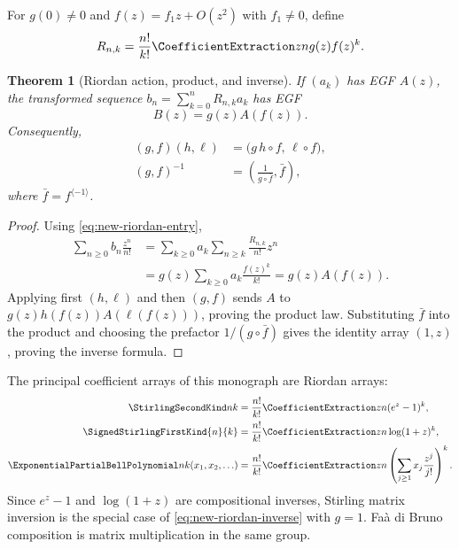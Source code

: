 \documentclass[11pt,a4paper,oneside,openany]{book}
\newtheorem{theorem}{Theorem}[chapter]
\theoremstyle{definition}
\theoremstyle{remark}
\begin{document}
For $g(0)\ne0$ and $f(z)=f_1z+O(z^2)$ with $f_1\ne0$, define
\begin{equation}\label{eq:new-riordan-entry}
 R_{n,k}=\frac{n!}{k!}\CoefficientExtraction z n g(z)f(z)^k.
\end{equation}

\begin{theorem}[Riordan action, product, and inverse]\label{thm:new-riordan}
If $(a_k)$ has EGF $A(z)$, the transformed sequence
$b_n=\sum_{k=0}^nR_{n,k}a_k$ has EGF
\begin{equation}\label{eq:new-riordan-action}
 B(z)=g(z)A(f(z)).
\end{equation}
Consequently,
\begin{align}
 (g,f)(h,\ell)&=\bigl(g\,h\!\circ f,\,\ell\!\circ f\bigr),
 \label{eq:new-riordan-product}\\
 (g,f)^{-1}&=\left(\frac1{g\circ\bar f},\bar f\right),
 \label{eq:new-riordan-inverse}
\end{align}
where $\bar f=f^{\langle-1\rangle}$.
\end{theorem}

\begin{proof}
Using \eqref{eq:new-riordan-entry},
\begin{align*}
 \sum_{n\ge0}b_n\frac{z^n}{n!}
 &=\sum_{k\ge0}a_k\sum_{n\ge k}\frac{R_{n,k}}{n!}z^n\\
 &=g(z)\sum_{k\ge0}a_k\frac{f(z)^k}{k!}=g(z)A(f(z)).
\end{align*}
Applying first $(h,\ell)$ and then $(g,f)$ sends $A$ to
$g(z)h(f(z))A(\ell(f(z)))$, proving the product law.  Substituting
$\bar f$ into the product and choosing the prefactor $1/(g\circ\bar f)$
gives the identity array $(1,z)$, proving the inverse formula.
\end{proof}

The principal coefficient arrays of this monograph are Riordan arrays:
\begin{align}
 \StirlingSecondKind nk&=\frac{n!}{k!}\CoefficientExtraction z n(e^z-1)^k,
 \label{eq:new-s2-riordan}\\
 \SignedStirlingFirstKind{n}{k}&=\frac{n!}{k!}\CoefficientExtraction z n\log(1+z)^k,
 \label{eq:new-s1-riordan}\\
 \ExponentialPartialBellPolynomial nk(x_1,x_2,\ldots)
 &=\frac{n!}{k!}\CoefficientExtraction z n
 \left(\sum_{j\ge1}x_j\frac{z^j}{j!}\right)^k.
 \label{eq:new-bell-riordan}
\end{align}
Since $e^z-1$ and $\log(1+z)$ are compositional inverses, Stirling matrix
inversion is the special case of \eqref{eq:new-riordan-inverse} with $g=1$.
Faà di Bruno composition is matrix multiplication in the same group.
\end{document}
